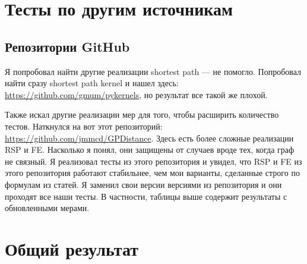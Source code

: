 \documentclass{article}
\begin{document}
\section{Тесты по другим источникам}

\subsection{Репозитории GitHub}
Я попробовал найти другие реализации shortest path --- не помогло. Попробовал найти сразу shortest path kernel и нашел здесь: \url{https://github.com/gmum/pykernels}, но результат все такой же плохой.

Также искал другие реализации мер для того, чтобы расширить количество тестов. Наткнулся на вот этот репозиторий: \url{https://github.com/jmmcd/GPDistance}. Здесь есть более сложные реализации RSP и FE. Насколько я понял, они защищены от случаев вроде тех, когда граф не связный. Я реализовал тесты из этого репозитория и увидел, что RSP и FE из этого репозитория работают стабильнее, чем мои варианты, сделанные строго по формулам из статей. Я заменил свои версии версиями из репозитория и они проходят все наши тесты. В частности, таблицы выше содержит результаты с обновленными мерами.

\section*{Общий результат}
\end{document}
